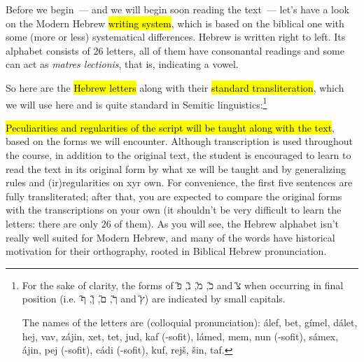 Before we begin~— and we will begin soon reading the text~— let's have a look on the Modern Hebrew \hl{writing system}, which is based on the biblical one with some (more or less) systematical differences. Hebrew is written right to left. Its alphabet consists of 26 letters, all of them have consonantal readings and some can act as \emph{matres lectionis}, that is, indicating a vowel.

So here are the \hl{Hebrew letters} along with their \hl{standard transliteration}, which we will use here and is quite standard in Semitic linguistics:\footnote{For the sake of clarity, the forms of \H{כ}, \H{מ}, \H{נ}, \H{פ} and \H{צ} when occurring in final position (i.e.~\H{ך}, \H{ם}, \H{ן}, \H{ף} and \H{ץ}) are indicated by small capitals.

	The names of the letters are (colloquial pronunciation): álef, bet, gímel, dálet, hej, vav, zájin, xet, tet, jud, kaf (-sofit), lámed, mem, nun (-sofit), sámex, ájin, pej (-sofit), cádi (-sofit), kuf, rejš, šin, taf.
}

\begin{center}
\H{
}
\end{center}

\noindent
\hl{Peculiarities and regularities of the script will be taught along with the text}, based on the forms we will encounter. Although transcription is used throughout the course, in addition to the original text, the student is encouraged to learn to read the text in its original form by what xe will be taught and by generalizing rules and (ir)regularities on xyr own. For convenience, the first five sentences are fully transliterated; after that, you are expected to compare the original forms with the transcriptions on your own (it shouldn't be very difficult to learn the letters: there are only 26 of them). As you will see, the Hebrew alphabet isn't really well suited for Modern Hebrew, and many of the words have historical motivation for their orthography, rooted in Biblical Hebrew pronunciation.

